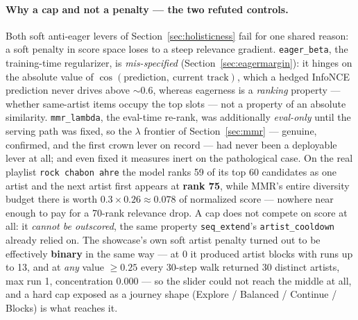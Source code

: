 \documentclass[11pt]{article}
\begin{document}
\paragraph{Why a cap and not a penalty --- the two refuted controls.} Both soft
anti-eager levers of Section~\ref{sec:holisticness} fail for one shared reason: a
soft penalty in score space loses to a steep relevance gradient.
\texttt{eager\_beta}, the training-time regularizer, is \emph{mis-specified}
(Section~\ref{sec:eagermargin}): it hinges on the absolute value of
$\cos(\text{prediction},\ \text{current track})$, which a hedged InfoNCE prediction never drives above ${\sim}0.6$,
whereas eagerness is a \emph{ranking} property --- whether same-artist items
occupy the top slots --- not a property of an absolute similarity.
\texttt{mmr\_lambda}, the eval-time re-rank, was additionally \emph{eval-only}
until the serving path was fixed, so the $\lambda$ frontier of
Section~\ref{sec:mmr} --- genuine, confirmed, and the first crown lever on record
--- had never been a deployable lever at all; and even fixed it measures inert on the pathological
case. On the real playlist \texttt{rock chabon ahre} the model ranks \num{59} of
its top \num{60} candidates as one artist and the next artist first appears at
\textbf{rank \num{75}}, while MMR's entire diversity budget there is worth
$\num{0.3}\times\num{0.26}\approx\num{0.078}$ of normalized score --- nowhere
near enough to pay for a 70-rank relevance drop. A cap does not compete on score
at all: it \emph{cannot be outscored}, the same property \texttt{seq\_extend}'s
\texttt{artist\_cooldown} already relied on. The showcase's own soft artist
penalty turned out to be effectively \textbf{binary} in the same way --- at
\num{0} it produced artist blocks with runs up to \num{13}, and at \emph{any}
value $\ge\num{0.25}$ every 30-step walk returned \num{30} distinct artists, max
run \num{1}, concentration \num{0.000} --- so the slider could not reach the
middle at all, and a hard cap exposed as a journey shape (Explore / Balanced /
Continue / Blocks) is what reaches it.
\end{document}
